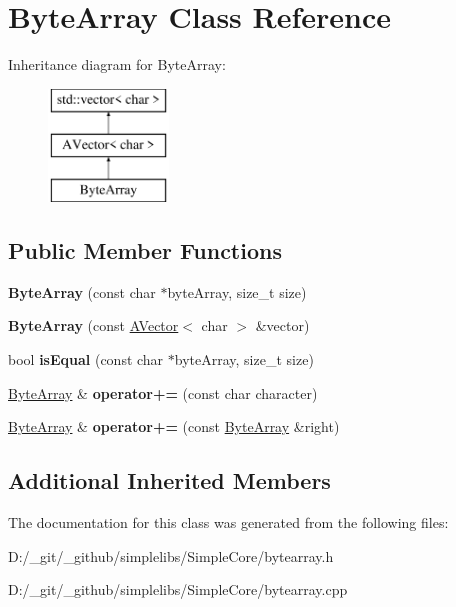 \hypertarget{class_byte_array}{}\section{Byte\+Array Class Reference}
\label{class_byte_array}
Inheritance diagram for Byte\+Array\+:\begin{figure}[H]
\begin{center}
\leavevmode
\includegraphics[height=3.000000cm]{class_byte_array}
\end{center}
\end{figure}
\subsection*{Public Member Functions}
\begin{DoxyCompactItemize}
\item 
\mbox{\label{class_byte_array_a348b99d4ab82362f71f277f0d176ff7e}} 
{\bfseries Byte\+Array} (const char $\ast$byte\+Array, size\+\_\+t size)
\item 
\mbox{\label{class_byte_array_a94a65f2b5c6952713712e23a574b0295}} 
{\bfseries Byte\+Array} (const \mbox{\hyperlink{class_a_vector}{A\+Vector}}$<$ char $>$ \&vector)
\item 
\mbox{\label{class_byte_array_a8b88df8611d65d429c274c23155c649a}} 
bool {\bfseries is\+Equal} (const char $\ast$byte\+Array, size\+\_\+t size)
\item 
\mbox{\label{class_byte_array_a9628e3e7992fad72928b39f9ca36ca1e}} 
\mbox{\hyperlink{class_byte_array}{Byte\+Array}} \& {\bfseries operator+=} (const char character)
\item 
\mbox{\label{class_byte_array_ab3635362b3abb48c398b38d91e37433b}} 
\mbox{\hyperlink{class_byte_array}{Byte\+Array}} \& {\bfseries operator+=} (const \mbox{\hyperlink{class_byte_array}{Byte\+Array}} \&right)
\end{DoxyCompactItemize}
\subsection*{Additional Inherited Members}


The documentation for this class was generated from the following files\+:\begin{DoxyCompactItemize}
\item 
D\+:/\+\_\+git/\+\_\+github/simplelibs/\+Simple\+Core/bytearray.\+h\item 
D\+:/\+\_\+git/\+\_\+github/simplelibs/\+Simple\+Core/bytearray.\+cpp\end{DoxyCompactItemize}

